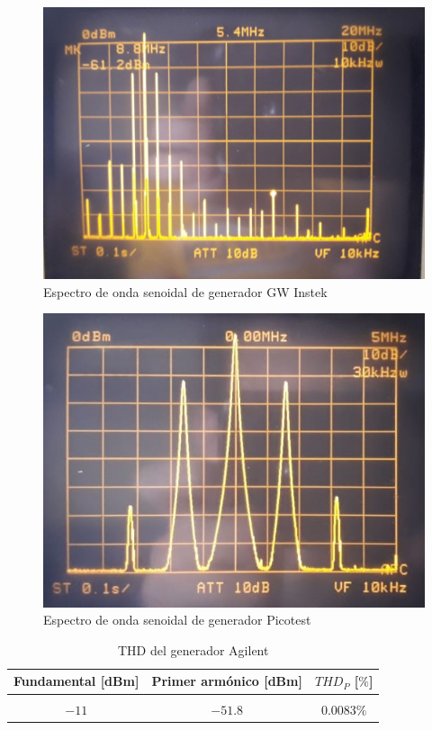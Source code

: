 \begin{figure}[H]
    \centering
    \includegraphics[scale=0.2]{../Mediciones/Ejercicio_1/generador_gwinstek.jpeg}
    \caption{Espectro de onda senoidal de generador GW Instek}
    \label{fig:thd_gwinstek}
\end{figure}

\begin{figure}[H]
    \centering
    \includegraphics[scale=0.65]{../Mediciones/Ejercicio_1/generador_picotest.jpeg}
    \caption{Espectro de onda senoidal de generador Picotest}
    \label{fig:thd_picotest}
\end{figure}

\begin{table}[H]
    \centering
    \begin{tabular}{c c c}
        Fundamental [dBm] & Primer arm\'onico [dBm] & $THD_P$ [$\%$]\\
        \hline \\
        $-11$ & $-51.8$ & $0.0083\%$ \\
        \hline
    \end{tabular}
    \caption{THD del generador Agilent}
\end{table}

